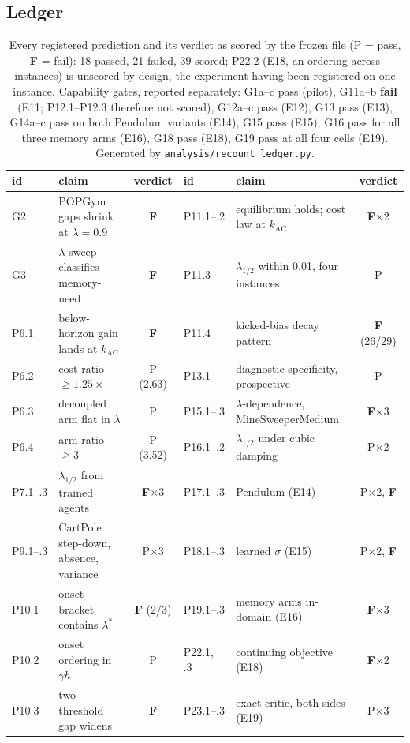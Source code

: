 \subsection{Ledger}
\label{sec:ledger}

\begin{table}[t]
\centering\small
\setlength{\tabcolsep}{4pt}
\begin{tabular}{@{}llc@{\hspace{10pt}}llc@{}}
\toprule
id & claim & verdict & id & claim & verdict \\
\midrule
G2 & POPGym gaps shrink at $\lambda{=}0.9$ & \textbf{F} &
P11.1--.2 & equilibrium holds; cost law at $k_{\mathrm{AC}}$ & \textbf{F}$\times$2 \\
G3 & $\lambda$-sweep classifies memory-need & \textbf{F} &
P11.3 & $\lambda_{1/2}$ within 0.01, four instances & P \\
P6.1 & below-horizon gain lands at $k_{\mathrm{AC}}$ & \textbf{F} &
P11.4 & kicked-bias decay pattern & \textbf{F} (26/29) \\
P6.2 & cost ratio $\ge1.25\times$ & P (2.63) &
P13.1 & diagnostic specificity, prospective & P \\
P6.3 & decoupled arm flat in $\lambda$ & P &
P15.1--.3 & $\lambda$-dependence, MineSweeperMedium & \textbf{F}$\times$3 \\
P6.4 & arm ratio $\ge3$ & P (3.52) &
P16.1--.2 & $\lambda_{1/2}$ under cubic damping & P$\times$2 \\
P7.1--.3 & $\lambda_{1/2}$ from trained agents & \textbf{F}$\times$3 &
P17.1--.3 & Pendulum (E14) & P$\times$2, \textbf{F} \\
P9.1--.3 & CartPole step-down, absence, variance & P$\times$3 &
P18.1--.3 & learned $\sigma$ (E15) & P$\times$2, \textbf{F} \\
P10.1 & onset bracket contains $\lambda^\ast$ & \textbf{F} (2/3) &
P19.1--.3 & memory arms in-domain (E16) & \textbf{F}$\times$3 \\
P10.2 & onset ordering in $\gamma h$ & P &
P22.1, .3 & continuing objective (E18) & \textbf{F}$\times$2 \\
P10.3 & two-threshold gap widens & \textbf{F} &
P23.1--.3 & exact critic, both sides (E19) & P$\times$3 \\
\bottomrule
\end{tabular}
\caption{Every registered prediction and its verdict as scored by the frozen
file (P = pass, \textbf{F} = fail): 18 passed, 21 failed, 39 scored; P22.2
(E18, an ordering across instances) is unscored by design, the experiment
having been registered on one instance. Capability gates, reported separately:
G1a--c pass (pilot), G11a--b \textbf{fail} (E11; P12.1--P12.3 therefore not
scored), G12a--c pass (E12), G13 pass (E13), G14a--c pass on both Pendulum
variants (E14), G15 pass (E15), G16 pass for all three memory arms (E16), G18
pass (E18), G19 pass at all four cells (E19). Generated by
\texttt{analysis/recount\_ledger.py}.}
\label{tab:ledger}
\end{table}
